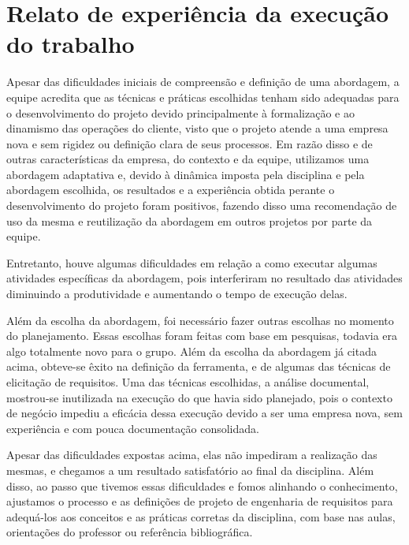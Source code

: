\section{Relato de experiência da execução do trabalho}

\indent Apesar das dificuldades iniciais de compreensão e definição de uma abordagem, a equipe acredita que as técnicas e 
práticas escolhidas tenham sido adequadas para o desenvolvimento do projeto devido principalmente à formalização e ao 
dinamismo das operações do cliente, visto que o projeto atende a uma empresa nova e sem rigidez ou definição clara de seus 
processos. Em razão disso e de outras características da empresa, do contexto e da equipe, utilizamos uma abordagem adaptativa 
e, devido à dinâmica imposta pela disciplina e pela abordagem escolhida, os resultados e a experiência obtida perante o 
desenvolvimento do projeto foram positivos, fazendo disso uma recomendação de uso da mesma e reutilização da abordagem em 
outros projetos por parte da equipe.

\indent Entretanto, houve algumas dificuldades em relação a como executar algumas atividades específicas da abordagem, pois 
interferiram no resultado das atividades diminuindo a produtividade e aumentando o tempo de execução delas.

\indent Além da escolha da abordagem, foi necessário fazer outras escolhas no momento do planejamento. Essas escolhas foram 
feitas com base em pesquisas, todavia era algo totalmente novo para o grupo. Além 
da escolha da abordagem já citada acima, obteve-se êxito na definição da ferramenta, e de algumas das técnicas de elicitação de requisitos. Uma das 
técnicas escolhidas, a análise documental, mostrou-se inutilizada na execução do que havia sido planejado, pois o contexto 
de negócio impediu a eficácia dessa execução devido a ser uma empresa nova, sem experiência e com pouca documentação 
consolidada.

\indent Apesar das dificuldades expostas acima, elas não impediram a realização das mesmas, e chegamos a um resultado satisfatório 
ao final da disciplina. Além disso, ao passo que tivemos essas dificuldades e fomos alinhando o conhecimento, ajustamos o processo 
e as definições de projeto de engenharia de requisitos para adequá-los aos conceitos e as práticas corretas da disciplina, com base 
nas aulas, orientações do professor ou referência bibliográfica.


